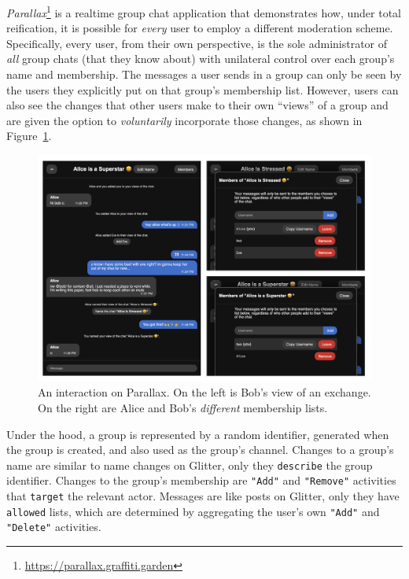 \emph{Parallax}\footnote{
\url{https://parallax.graffiti.garden}
} is a realtime group chat application that demonstrates
how, under total reification, it is possible for \emph{every} user to employ a different
moderation scheme.
Specifically,
every user, from their own perspective,
is the sole administrator of \emph{all} group chats (that they know about) with
unilateral control over each group's name and membership.
The messages a user sends in a group can only be seen by the users they explicitly
put on that group's membership list.
However, users can also see the changes that other users
make to their own ``views'' of a group and are given the option
to \emph{voluntarily} incorporate those changes,
as shown in Figure~\ref{case-studies:fig:parallax}.

\begin{figure}[h]
    \centering
    \includegraphics[width=\textwidth]{paper/figures/parallax.png}
    \caption{An interaction on Parallax. On the left is Bob's view of an exchange. On the right are Alice and Bob's \emph{different} membership lists.}
    
    \label{case-studies:fig:parallax}
\end{figure}

Under the hood, a group is represented by a random identifier,
generated when the group is created, and also used as the group's channel.
Changes to a group's name are similar to name changes on Glitter, only they
\texttt{describe} the group identifier.
Changes to the group's membership are \texttt{"Add"}
and \texttt{"Remove"} activities that \texttt{target} the relevant actor.
Messages are like posts on Glitter, only they have \texttt{allowed} lists, which are determined
by aggregating the user's own \texttt{"Add"} and \texttt{"Delete"} activities.

